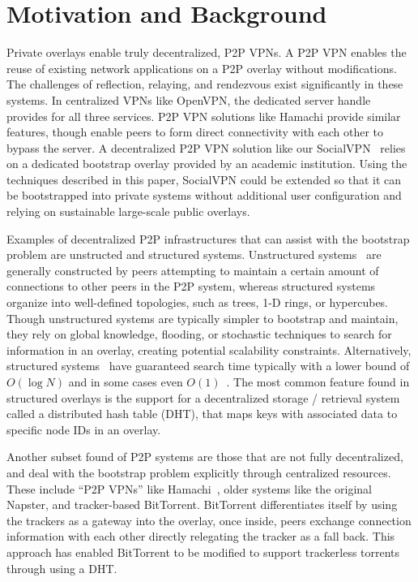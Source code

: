 \documentclass[conference]{IEEEtran}
\begin{document}
\section{Motivation and Background}
\label{background}

Private overlays enable truly decentralized, P2P VPNs.  A P2P VPN enables the
reuse of existing network applications on a P2P overlay without modifications.
The challenges of reflection, relaying, and rendezvous exist significantly in
these systems.  In centralized VPNs like OpenVPN, the dedicated server handle
provides for all three services.  P2P VPN solutions like Hamachi provide
similar features, though enable peers to form direct connectivity with each
other to bypass the server.  A decentralized P2P VPN solution like our
SocialVPN~\cite{socialvpn} relies on a dedicated bootstrap overlay provided by
an academic institution.  Using the techniques described in this paper,
SocialVPN could be extended so that it can be bootstrapped into private systems
without additional user configuration and relying on sustainable large-scale
public overlays.

Examples of decentralized P2P infrastructures that can assist with the
bootstrap problem are unstructed and structured systems.  Unstructured
systems~\cite{gnutella, fasttrack} are generally constructed by peers
attempting to maintain a certain amount of connections to other peers in the
P2P system, whereas structured systems organize into well-defined topologies,
such as trees, 1-D rings, or hypercubes.  Though unstructured systems are
typically simpler to bootstrap and maintain, they rely on global knowledge,
flooding, or stochastic techniques to search for information in an overlay,
creating potential scalability constraints.  Alternatively, structured
systems~\cite{pastry, chord, symphony, kademlia, can} have guaranteed search
time typically with a lower bound of $O(\log N)$ and in some cases even
$O(1)$~\cite{beehive}.  The most common feature found in structured overlays is
the support for a decentralized storage / retrieval system called a distributed
hash table (DHT), that maps keys with associated data to specific node IDs in
an overlay.  

Another subset found of P2P systems are those that are not fully decentralized,
and deal with the bootstrap problem explicitly through centralized resources.
These include ``P2P VPNs'' like Hamachi~\cite{hamachi}, older systems like the
original Napster, and tracker-based BitTorrent.  BitTorrent differentiates
itself by using the trackers as a gateway into the overlay, once inside, peers
exchange connection information with each other directly relegating the tracker
as a fall back.  This approach has enabled BitTorrent to be modified to support
trackerless torrents through using a DHT.
\end{document}
